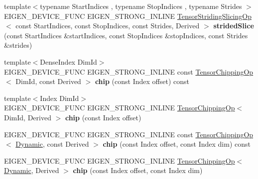 \begin{DoxyCompactItemize}
\item 
\mbox{\label{class_eigen_1_1_tensor_base_aaca6ee903e5ab0d5cd9097ef9953f5e3}} 
{\footnotesize template$<$typename Start\+Indices , typename Stop\+Indices , typename Strides $>$ }\\E\+I\+G\+E\+N\+\_\+\+D\+E\+V\+I\+C\+E\+\_\+\+F\+U\+NC E\+I\+G\+E\+N\+\_\+\+S\+T\+R\+O\+N\+G\+\_\+\+I\+N\+L\+I\+NE \hyperlink{class_eigen_1_1_tensor_striding_slicing_op}{Tensor\+Striding\+Slicing\+Op}$<$ const Start\+Indices, const Stop\+Indices, const Strides, Derived $>$ {\bfseries strided\+Slice} (const Start\+Indices \&start\+Indices, const Stop\+Indices \&stop\+Indices, const Strides \&strides)
\item 
\mbox{\label{class_eigen_1_1_tensor_base_acebda719199f45ed7e77db1730ae7a43}} 
{\footnotesize template$<$Dense\+Index Dim\+Id$>$ }\\E\+I\+G\+E\+N\+\_\+\+D\+E\+V\+I\+C\+E\+\_\+\+F\+U\+NC E\+I\+G\+E\+N\+\_\+\+S\+T\+R\+O\+N\+G\+\_\+\+I\+N\+L\+I\+NE const \hyperlink{class_eigen_1_1_tensor_chipping_op}{Tensor\+Chipping\+Op}$<$ Dim\+Id, const Derived $>$ {\bfseries chip} (const Index offset) const
\item 
\mbox{\label{class_eigen_1_1_tensor_base_a0016263c69b25dcfef7655b0a56f52ff}} 
{\footnotesize template$<$Index Dim\+Id$>$ }\\E\+I\+G\+E\+N\+\_\+\+D\+E\+V\+I\+C\+E\+\_\+\+F\+U\+NC E\+I\+G\+E\+N\+\_\+\+S\+T\+R\+O\+N\+G\+\_\+\+I\+N\+L\+I\+NE \hyperlink{class_eigen_1_1_tensor_chipping_op}{Tensor\+Chipping\+Op}$<$ Dim\+Id, Derived $>$ {\bfseries chip} (const Index offset)
\item 
\mbox{\label{class_eigen_1_1_tensor_base_a6f84df0f9fa6b6e14b03da2822f42639}} 
E\+I\+G\+E\+N\+\_\+\+D\+E\+V\+I\+C\+E\+\_\+\+F\+U\+NC E\+I\+G\+E\+N\+\_\+\+S\+T\+R\+O\+N\+G\+\_\+\+I\+N\+L\+I\+NE const \hyperlink{class_eigen_1_1_tensor_chipping_op}{Tensor\+Chipping\+Op}$<$ \hyperlink{namespace_eigen_ad81fa7195215a0ce30017dfac309f0b2}{Dynamic}, const Derived $>$ {\bfseries chip} (const Index offset, const Index dim) const
\item 
\mbox{\label{class_eigen_1_1_tensor_base_a5b7439137451f37c26f9f40ae4b3f201}} 
E\+I\+G\+E\+N\+\_\+\+D\+E\+V\+I\+C\+E\+\_\+\+F\+U\+NC E\+I\+G\+E\+N\+\_\+\+S\+T\+R\+O\+N\+G\+\_\+\+I\+N\+L\+I\+NE \hyperlink{class_eigen_1_1_tensor_chipping_op}{Tensor\+Chipping\+Op}$<$ \hyperlink{namespace_eigen_ad81fa7195215a0ce30017dfac309f0b2}{Dynamic}, Derived $>$ {\bfseries chip} (const Index offset, const Index dim)

\end{DoxyCompactItemize}
